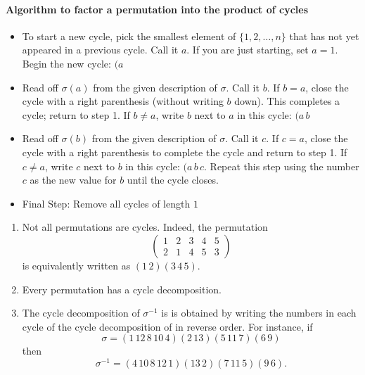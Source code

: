 \documentclass[11pt,a4paper]{article}
\begin{document}
\paragraph*{Algorithm to factor a permutation into the product of cycles} 
\begin{itemize}
    \item To start a new cycle, pick the smallest element of $\{1, 2, \dots, n\}$ that has not yet appeared in a previous cycle. Call it $a$. If you are just starting, set $a = 1$. Begin the new cycle: $(a$
    
    \item Read off $\sigma(a)$ from the given description of $\sigma$. Call it $b$. If $b = a$, close the cycle with a right parenthesis (without writing $b$ down). This completes a cycle; return to step 1. If $b \neq a$, write $b$ next to $a$ in this cycle: $(a \, b$
    
    \item Read off $\sigma(b)$ from the given description of $\sigma$. Call it $c$. If $c = a$, close the cycle with a right parenthesis to complete the cycle and return to step 1. If $c \neq a$, write $c$ next to $b$ in this cycle: $(a \, b \, c$. Repeat this step using the number $c$ as the new value for $b$ until the cycle closes.
    \item  Final Step: Remove all cycles of length \(1\)
\end{itemize}

\begin{rem}
    \begin{enumerate}[label=(\roman*)]
        \item Not all permutations are cycles. Indeed, the  permutation \[
             \begin{pmatrix}
            1 & 2 & 3 & 4 & 5 \\
            2 & 1 & 4 & 5 & 3
            \end{pmatrix}
            \]
             is equivalently written as 
            \((1 \, 2)(3 \, 4 \, 5)\). 
        \item Every permutation has a cycle decomposition.
        \item The cycle decomposition of \(\sigma^{-1}\) is is obtained by writing the numbers in each cycle of the cycle decomposition of  in reverse order.
        For instance, if \[
            \sigma = (1 \, 12 \, 8 \, 10 \, 4)(2 \, 13)(5 \, 11 \, 7)(6 \, 9)
            \]
            then
            \[
            \sigma^{-1} = (4 \, 10 \, 8 \, 12 \, 1)(13 \, 2)(7 \, 11 \, 5)(9 \, 6).
            \]
    \end{enumerate}
\end{rem}
\end{document}
